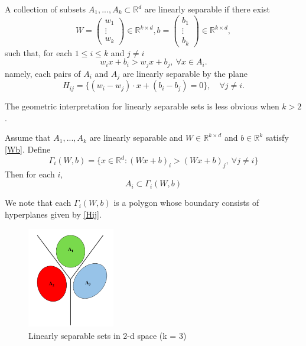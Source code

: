 \begin{definition}
  A collection of subsets $A_1,...,A_k\subset \mathbb{R}^d$ are
  linearly separable if there exist
  \begin{equation}
    \label{Wb}
W=
\begin{pmatrix}
  w_1\\
\vdots\\
w_k
\end{pmatrix}
\in \mathbb{R}^{k\times d}, 
b=
\begin{pmatrix}
  b_1\\
\vdots\\
b_k
\end{pmatrix}
\in \mathbb{R}^{k\times d}, 
\end{equation}
such that,   for each $1\le i\le k$ and $ j \neq i$
\begin{equation}
\label{eq:3}
 w_ix+b_i > w_jx+b_j,\ \forall x\in A_i.
 \end{equation}
namely, each pairs of $A_i$ and $A_j$ are linearly separable by the plane
\begin{equation}
  \label{Hij}
H_{ij}=\{(w_i-w_j)\cdot x+(b_i-b_j) = 0\}, \quad \forall j\neq i.
\end{equation} 
\end{definition}
The geometric interpretation for linearly separable sets is less
obvious when $k>2$. 
\begin{lemma}{\label{Interplation}}
Assume that $A_1,...,A_k$ are linearly separable and $ W\in
\mathbb{R}^{k\times d} $ and $b\in\mathbb{R}^k $ satisfy \eqref{Wb}.  Define
\begin{equation}
\label{Gammai}
\Gamma_i(W,b) = \{x\in\mathbb R^d: (Wx+b)_i > (Wx+b)_j,\ \forall j \neq i\}     
\end{equation}
Then for each $i$, 
\begin{equation}
  \label{AiGamma}
A_i \subset \Gamma_i(W,b)  
\end{equation}
\end{lemma}
We note that  each $\Gamma_i(W,b)  $ is a polygon whose boundary consists of hyperplanes given by 
\eqref{Hij}.
\begin{figure}
\centering
	\includegraphics[width=1.5in]{./figures/3-class.PNG}
	\caption{Linearly separable sets in 2-d space (k = 3)}
	\label{twoclassification}
\end{figure}

